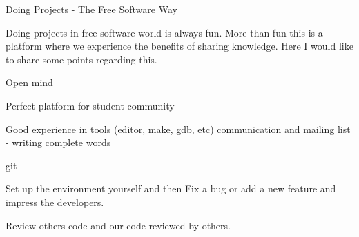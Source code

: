 Doing Projects - The Free Software Way

Doing projects in free software world is always fun. More than fun this is a platform where
we experience the benefits of sharing knowledge. Here I would like to share some points 
regarding this.

Open mind

Perfect platform for student community

Good experience in tools (editor, make, gdb, etc)
communication and mailing list - writing complete words

git

Set up the environment yourself and then Fix a bug or add a new feature and impress the
developers.


Review others code and our code reviewed by others.


